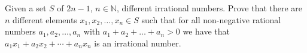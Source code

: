 Given a set \(S\) of \(2n-1\), \(n\in \mathbb N\), different irrational numbers. Prove that there are \(n\) different elements \(x_1, x_2, \ldots, x_n\in S\) such that for all non-negative rational numbers \(a_1, a_2, \ldots, a_n\) with \(a_1+a_2+\ldots + a_n>0\) we have that \(a_1x_1+a_2x_2+\cdots +a_nx_n\) is an irrational number.